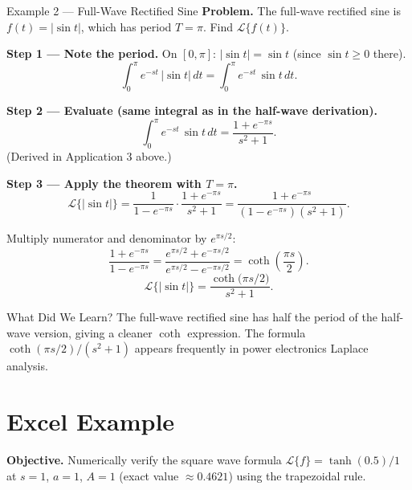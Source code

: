 \documentclass[12pt,a4paper]{article}
\begin{document}
\begin{infobox}{Example 2 --- Full-Wave Rectified Sine}
\textbf{Problem.}  The full-wave rectified sine is $f(t) = |\sin t|$, which
has period $T = \pi$.  Find $\mathcal{L}\{f(t)\}$.

\textbf{Step 1 --- Note the period.}
On $[0,\pi]$: $|\sin t| = \sin t$ (since $\sin t \geq 0$ there).
\[
  \int_0^{\pi} e^{-st}\,|\sin t|\,dt = \int_0^{\pi} e^{-st}\,\sin t\,dt.
\]

\textbf{Step 2 --- Evaluate (same integral as in the half-wave derivation).}
\[
  \int_0^{\pi} e^{-st}\,\sin t\,dt = \frac{1+e^{-\pi s}}{s^2+1}.
\]
(Derived in Application 3 above.)

\textbf{Step 3 --- Apply the theorem with $T = \pi$.}
\[
  \mathcal{L}\{|\sin t|\}
  = \frac{1}{1-e^{-\pi s}} \cdot \frac{1+e^{-\pi s}}{s^2+1}
  = \frac{1+e^{-\pi s}}{(1-e^{-\pi s})(s^2+1)}.
\]

Multiply numerator and denominator by $e^{\pi s/2}$:
\[
  \frac{1+e^{-\pi s}}{1-e^{-\pi s}}
  = \frac{e^{\pi s/2}+e^{-\pi s/2}}{e^{\pi s/2}-e^{-\pi s/2}}
  = \coth\!\left(\frac{\pi s}{2}\right).
\]
\[
  \boxed{
  \mathcal{L}\{|\sin t|\} = \frac{\coth\!\bigl(\pi s/2\bigr)}{s^2+1}.
  }
\]
\end{infobox}

\begin{learnbox}{What Did We Learn?}
The full-wave rectified sine has half the period of the half-wave version,
giving a cleaner $\coth$ expression.  The formula $\coth(\pi s/2)/(s^2+1)$
appears frequently in power electronics Laplace analysis.
\end{learnbox}

\section{Excel Example}

\textbf{Objective.}  Numerically verify the square wave formula
$\mathcal{L}\{f\}= \tanh(0.5)/1$ at $s=1$, $a=1$, $A=1$
(exact value $\approx 0.4621$) using the trapezoidal rule.
\end{document}
